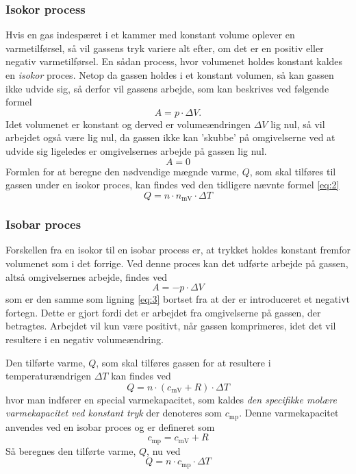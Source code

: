 \documentclass[SRC.tex]{subfiles}
\begin{document}
	\subsubsection{Isokor process} 
	Hvis en gas indespæret i et kammer med konstant volume oplever en varmetilførsel, så vil 
	gassens tryk variere alt efter, om det er en positiv eller negativ varmetilførsel. En sådan
	process, hvor volumenet holdes konstant kaldes en \textit{isokor} proces. Netop da gassen
	holdes i et konstant volumen, så kan gassen ikke udvide sig, så derfor vil gassens arbejde,
	som kan beskrives ved følgende formel
	\begin{equation}
	A = p \cdot \Delta V.
	\label{eq:3}
	\end{equation}
	Idet volumenet er konstant og derved er volumeændringen \(\Delta V\) lig nul, så vil arbejdet
	også være lig nul, da gassen ikke kan 'skubbe' på omgivelserne ved at udvide sig ligeledes er 
	omgivelsernes arbejde på gassen lig nul.
	\begin{equation}
	A = 0
	\end{equation}
	Formlen for at beregne den nødvendige mægnde varme, \(Q\), som skal tilføres til gassen under 
	en isokor proces, kan findes ved den tidligere nævnte formel \eqref{eq:2}
	\begin{equation}
	Q = n \cdot n_{\text{mV}} \cdot \Delta T
	\end{equation}
	
	\subsubsection{Isobar proces}
	Forskellen fra en isokor til en isobar process er, at trykket 
	holdes konstant fremfor volumenet som i det forrige. Ved
	denne proces kan det udførte arbejde på gassen, altså 
	omgivelsernes arbejde, findes ved
	\begin{equation}
	A = -p \cdot \Delta V
	\end{equation}
	som er den samme som ligning \eqref{eq:3} bortset fra at
	der er introduceret et negativt fortegn. Dette er gjort fordi det er arbejdet fra omgivelserne 
	på gassen, der betragtes. Arbejdet vil kun være positivt, når gassen komprimeres, idet det 
	vil resultere i en negativ volumeændring.  
	
	Den tilførte varme, \(Q\), som skal tilføres gassen for at 
	resultere i temperaturændrigen \(\Delta T\) kan findes ved
	\begin{equation}
	Q = n \cdot (c_{\text{mV}} + R) \cdot \Delta T
	\end{equation} 
	hvor man indfører en special varmekapacitet, som kaldes \textit{den specifikke molære varmekapacitet ved konstant tryk} der denoteres som \(c_{\text{mp}}\). Denne varmekapacitet anvendes ved en isobar proces og er defineret som
	\begin{equation}
	c_{\text{mp}} = c_{\text{mV}} + R
	\end{equation}
	Så beregnes den tilførte varme, \(Q\), nu ved
	\begin{equation}
	Q = n \cdot c_{\text{mp}} \cdot \Delta T
	\end{equation}
\end{document}
